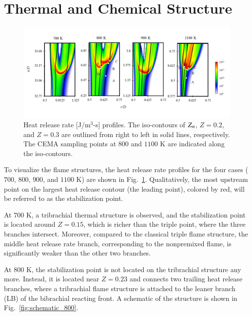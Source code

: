 \documentclass[review,3p,times]{elsarticle}
\begin{document}
\section{Thermal and Chemical Structure} \label{sec:structure}

\begin{figure}[t]
  \centering
  \scriptsize
  \vspace{-0.1in}
  \includegraphics[width=1.0\textwidth]{HRR.png}
  \normalsize
  \vspace{-0.1in}
  \caption{Heat release rate [J/m$^3$-s] profiles.  The iso-contours of $Z_{\rm st}$, $Z = 0.2$, and $Z = 0.3$ are outlined from right to left in solid lines, respectively.  The CEMA sampling points at $800$ and $1100$ K are indicated along the iso-contours.}
  \label{fig:HRR}
\end{figure}

To visualize the flame structures, the heat release rate profiles for the four cases ($700$, $800$, $900$, and $1100$ K) are shown in Fig.~\ref{fig:HRR}.  Qualitatively, the most upstream point on the largest heat release contour (the leading point), colored by red, will be referred to as the stabilization point.  

At $700$ K, a tribrachial thermal structure is observed, and the stabilization point is located around $Z = 0.15$, which is richer than the triple point, where the three branches intersect.  Moreover, compared to the classical triple flame structure, the middle heat release rate branch, corresponding to the nonpremixed flame, is significantly weaker than the other two branches.  

At $800$ K, the stabilization point is not located on the tribrachial structure any more.  Instead, it is located near $Z = 0.23$ and connects two trailing heat release branches, where a tribrachial flame structure is attached to the leaner branch (LB) of the bibrachial reacting front.  A schematic of the structure is shown in Fig.~\ref{fig:schematic_800}.
\end{document}
